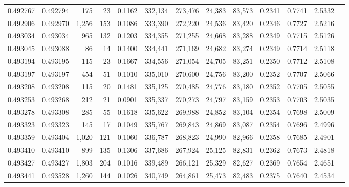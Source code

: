 \begin{tabular}{rrrrrrrrrrrrr}
0.492767 & 0.492794 &   175 &    23 &                                     0.1162 & 332,134 & 273,476 &  24,383 &  83,573 & 0.2341 & 0.7741 & 2.5332 \\
0.492906 & 0.492970 & 1,256 &   153 &                                     0.1086 & 333,390 & 272,220 &  24,536 &  83,420 & 0.2346 & 0.7727 & 2.5216 \\
0.493034 & 0.493034 &   965 &   132 &                                     0.1203 & 334,355 & 271,255 &  24,668 &  83,288 & 0.2349 & 0.7715 & 2.5126 \\
0.493045 & 0.493088 &    86 &    14 &                                     0.1400 & 334,441 & 271,169 &  24,682 &  83,274 & 0.2349 & 0.7714 & 2.5118 \\
0.493194 & 0.493195 &   115 &    23 &                                     0.1667 & 334,556 & 271,054 &  24,705 &  83,251 & 0.2350 & 0.7712 & 2.5108 \\
0.493197 & 0.493197 &   454 &    51 &                                     0.1010 & 335,010 & 270,600 &  24,756 &  83,200 & 0.2352 & 0.7707 & 2.5066 \\
0.493208 & 0.493208 &   115 &    20 &                                     0.1481 & 335,125 & 270,485 &  24,776 &  83,180 & 0.2352 & 0.7705 & 2.5055 \\
0.493253 & 0.493268 &   212 &    21 &                                     0.0901 & 335,337 & 270,273 &  24,797 &  83,159 & 0.2353 & 0.7703 & 2.5035 \\
0.493278 & 0.493308 &   285 &    55 &                                     0.1618 & 335,622 & 269,988 &  24,852 &  83,104 & 0.2354 & 0.7698 & 2.5009 \\
0.493323 & 0.493323 &   145 &    17 &                                     0.1049 & 335,767 & 269,843 &  24,869 &  83,087 & 0.2354 & 0.7696 & 2.4996 \\
0.493359 & 0.493404 & 1,020 &   121 &                                     0.1060 & 336,787 & 268,823 &  24,990 &  82,966 & 0.2358 & 0.7685 & 2.4901 \\
0.493410 & 0.493410 &   899 &   135 &                                     0.1306 & 337,686 & 267,924 &  25,125 &  82,831 & 0.2362 & 0.7673 & 2.4818 \\
0.493427 & 0.493427 & 1,803 &   204 &                                     0.1016 & 339,489 & 266,121 &  25,329 &  82,627 & 0.2369 & 0.7654 & 2.4651 \\
0.493441 & 0.493528 & 1,260 &   144 &                                     0.1026 & 340,749 & 264,861 &  25,473 &  82,483 & 0.2375 & 0.7640 & 2.4534 \\

\end{tabular}
